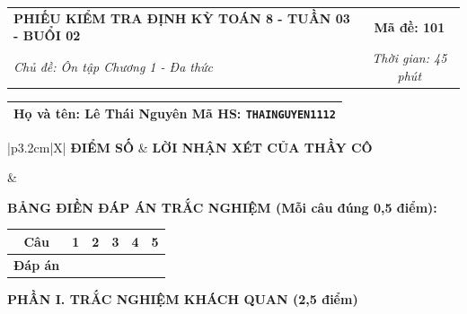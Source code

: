 \documentclass[12pt,a4paper]{article}
\begin{document}
\newpage



\noindent
\begin{tabularx}{\linewidth}{|X|c|}
\hline
\textbf{PHIẾU KIỂM TRA ĐỊNH KỲ TOÁN 8 - TUẦN 03 - BUỔI 02} & \textbf{Mã đề: 101} \\
\textit{Chủ đề: Ôn tập Chương 1 - Đa thức} & \textit{Thời gian: 45 phút} \\
\hline
\end{tabularx}

\vspace{1mm}

\noindent
\begin{tabularx}{\linewidth}{|X|}
\hline
\rule[-2mm]{0pt}{7.5mm}\textbf{Họ và tên:} \textbf{\large Lê Thái Nguyên} \hfill \textbf{Mã HS:} \texttt{THAINGUYEN1112} \quad \\
\hline
\end{tabularx}

\vspace{1mm}

\noindent
\begin{tabularx}{\linewidth}{|p{3.2cm}|X|}
\hline
\centering\textbf{ĐIỂM SỐ} & \centering\textbf{LỜI NHẬN XÉT CỦA THẦY CÔ} \tabularnewline
\hline
\rule{0pt}{1.3cm} & \tabularnewline
\hline
\end{tabularx}

\vspace{1.2mm}

\noindent\textbf{BẢNG ĐIỀN ĐÁP ÁN TRẮC NGHIỆM (Mỗi câu đúng 0,5 điểm):}
\vspace{0.8mm}

\noindent
\renewcommand{\arraystretch}{1.35}
\begin{tabularx}{\linewidth}{|c|*{5}{>{\centering\arraybackslash}X|}}
\hline
\textbf{Câu} & \textbf{1} & \textbf{2} & \textbf{3} & \textbf{4} & \textbf{5} \\
\hline
\textbf{Đáp án} & & & & & \\
\hline
\end{tabularx}
\renewcommand{\arraystretch}{1.0}

\vspace{1.5mm}

\noindent\textbf{\large PHẦN I. TRẮC NGHIỆM KHÁCH QUAN (2,5 điểm)}
\vspace{1mm}
\end{document}

